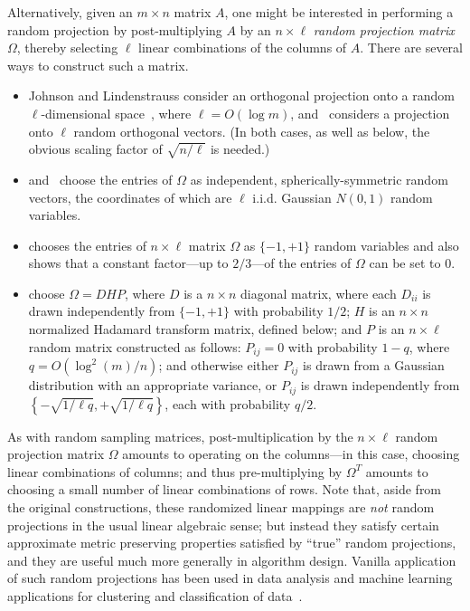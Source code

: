 \documentclass[twoside]{article}
\begin{document}
Alternatively, given an $m \times n$ matrix $A$, one might be interested in 
performing a random projection by post-multiplying $A$ by an 
$n \times \ell$ \emph{random projection matrix} $\Omega$, thereby selecting 
$\ell$ linear combinations of the columns of $A$.
There are several ways to construct such a matrix.
\begin{itemize}
\item
Johnson and Lindenstrauss consider an orthogonal projection onto a random 
$\ell$-dimensional space~\cite{JL84}, where $\ell=O(\log m)$, 
and~\cite{FH87} considers a projection onto $\ell$ random orthogonal vectors.
(In both cases, as well as below, the obvious scaling factor of 
$\sqrt{n/\ell}$ is needed.)
\item
\cite{IM98} and~\cite{DG02} 
choose
the entries of $\Omega$ as independent, 
spherically-symmetric random vectors, the coordinates of which are $\ell$ 
i.i.d. Gaussian $N(0,1)$ random variables. 
\item
\cite{Ach03_JRNL} 
chooses
the entries of $n \times \ell$ matrix $\Omega$ as $\{-1,+1\}$ random 
variables and also shows that a constant factor---up to $2/3$---of the 
entries of $\Omega$ can be set to $0$.
\item
\cite{AC06,AC06-JRNL09,Matousek08_RSA} choose $\Omega = D H P$, where $D$ 
is a $n \times n$ diagonal matrix, where each $D_{ii}$ is drawn 
independently from $\{-1,+1\}$ with probability $1/2$; $H$ is an 
$n \times n$ normalized Hadamard transform matrix, defined below; and 
$P$ is an $n \times \ell$ random matrix constructed as follows:
$P_{ij}=0$ with probability $1-q$, where $q=O(\log^2(m)/n)$;
and otherwise either $P_{ij}$ is drawn from a Gaussian distribution with 
an appropriate variance, or $P_{ij}$ is drawn independently from 
$\left\{-\sqrt{1/\ell q},+\sqrt{1/\ell q}\right\}$, each with probability $q/2$.
\end{itemize}
As with random sampling matrices, post-multiplication by the $n \times \ell$ 
random projection matrix $\Omega$ amounts to operating on the columns---in 
this case, choosing linear combinations of columns; and thus pre-multiplying 
by $\Omega^T$ amounts to choosing a small number of linear combinations of 
rows.
Note that, aside from the original constructions, these randomized linear 
mappings are \emph{not} random projections in the usual linear algebraic 
sense; but instead they satisfy certain approximate metric preserving 
properties satisfied by ``true'' random projections, and they are useful 
much more generally in algorithm design.
Vanilla application of such random projections has been used in data 
analysis and machine learning applications for clustering and classification 
of data~\cite{Kas98,BM01,FM03,FB03,GBN05,VW11}.
\end{document}
